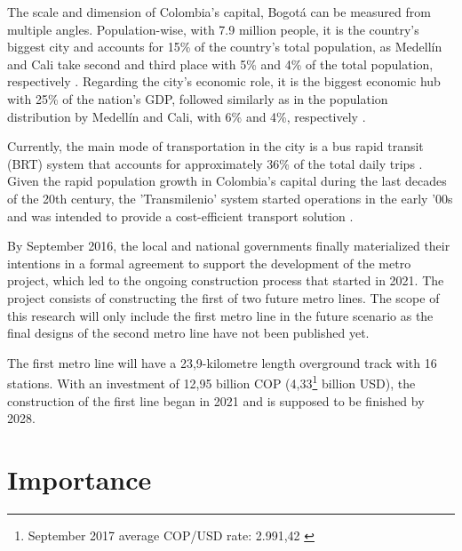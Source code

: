 \documentclass[12pt, a4paper]{report}
\begin{document}
The scale and dimension of Colombia's capital, Bogot\'{a} can be measured from multiple angles. Population-wise, with 7.9 million people, it is the country's biggest city and accounts for 15\% of the country's total population, as Medell\'{i}n and Cali take second and third place with 5\% and 4\% of the total population, respectively \citep{daneProyeccionesPoblacionPopulation2023}. Regarding the city's economic role, it is the biggest economic hub with 25\% of the nation's GDP, followed similarly as in the population distribution by Medell\'{i}n and Cali, with 6\% and 4\%, respectively \citep{daneCuentasNacionalesDepartamentales2023}.

Currently, the main mode of transportation in the city is a bus rapid transit (BRT) system that accounts for approximately 36\% of the total daily trips \citep{alcaldiadebogotad.c.EncuestaMovilidad20192019}. Given the rapid population growth in Colombia's capital during the last decades of the 20th century, the 'Transmilenio' system started operations in the early '00s and was intended to provide a cost-efficient transport solution \citep{rodriguezValueAccessibilityBogota2004}. 

By September 2016, the local and national governments finally materialized their intentions in a formal agreement to support the development of the metro project, which led to the ongoing construction process that started in 2021. The project consists of constructing the first of two future metro lines. The scope of this research will only include the first metro line in the future scenario as the final designs of the second metro line have not been published yet. 

The first metro line will have a 23,9-kilometre length overground track with 16 stations. With an investment of 12,95 billion COP (4,33\footnote{September 2017 average COP/USD rate: 2.991,42 \citep{bancodelarepublicaTasaCambioRepresentativa2023}} billion USD), the construction of the first line began in 2021 and is supposed to be finished by 2028.



\section{Importance}
\end{document}
